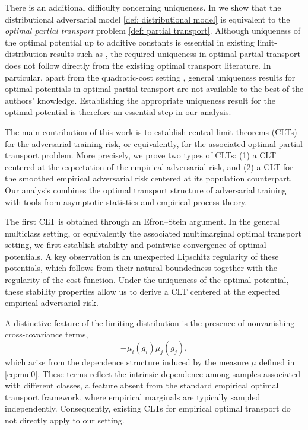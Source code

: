 \documentclass{amsart}
\theoremstyle{plain}
\numberwithin{equation}{section}\newtheorem{theorem}{Theorem}[section]
\theoremstyle{remark}
\begin{document}
There is an additional difficulty concerning uniqueness.  In  we show that the distributional adversarial model \eqref{def: distributional model} is equivalent to the \emph{optimal partial transport} problem \eqref{def: partial transport}. Although uniqueness of the optimal potential up to additive constants is essential in existing limit-distribution results such as \cite{CLT_OT2019, Goldfeld_Kato_Rioux_Sadhu2024, CLT_general_transport2024}, the required uniqueness in optimal partial transport does not follow directly from the existing optimal transport literature. In particular, apart from the quadratic-cost setting \cite{CM2010Annalsmath}, general uniqueness results for optimal potentials in optimal partial transport are not available to the best of the authors' knowledge. Establishing the appropriate uniqueness result for the optimal potential is therefore an essential step in our analysis.




The main contribution of this work is to establish central limit theorems (CLTs) for the adversarial training risk, or equivalently, for the associated optimal partial transport problem. More precisely, we prove two types of CLTs: (1) a CLT centered at the expectation of the empirical adversarial risk, and (2) a CLT for the smoothed empirical adversarial risk centered at its population counterpart. Our analysis combines the optimal transport structure of adversarial training with tools from asymptotic statistics and empirical process theory.

The first CLT is obtained through an Efron--Stein argument. In the general multiclass setting, or equivalently the associated multimarginal optimal transport setting, we first establish stability and pointwise convergence of optimal potentials. A key observation is an unexpected Lipschitz regularity of these potentials, which follows from their natural boundedness together with the regularity of the cost function. Under the uniqueness of the optimal potential, these stability properties allow us to derive a CLT centered at the expected empirical adversarial risk.

A distinctive feature of the limiting distribution is the presence of nonvanishing cross-covariance terms,
\[
    -\mu_i(g_i)\mu_j(g_j),
\]
which arise from the dependence structure induced by the measure $\mu$ defined in \eqref{eq:mui0}. These terms reflect the intrinsic dependence among samples associated with different classes, a feature absent from the standard empirical optimal transport framework, where empirical marginals are typically sampled independently. Consequently, existing CLTs for empirical optimal transport do not directly apply to our setting.
\end{document}
